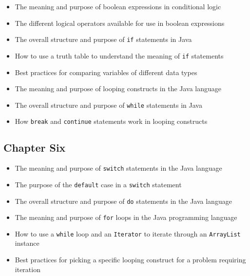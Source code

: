 \begin{itemize}

  \itemsep -.015in
  \item The meaning and purpose of boolean expressions in conditional logic
  \item The different logical operators available for use in boolean expressions
  \item The overall structure and purpose of {\tt if} statements in Java
  \item How to use a truth table to understand the meaning of {\tt if} statements
  \item Best practices for comparing variables of different data types
  \item The meaning and purpose of looping constructs in the Java language
  \item The overall structure and purpose of {\tt while} statements in Java
  \item How {\tt break} and {\tt continue} statements work in looping constructs

\end{itemize}

\vspace*{-.15in}
\subsection*{Chapter Six}
\vspace*{-.15in}

\begin{itemize}

  \itemsep -.015in
  \item The meaning and purpose of {\tt switch} statements in the Java language
  \item The purpose of the {\tt default} case in a {\tt switch} statement
  \item The overall structure and purpose of {\tt do} statements in the Java language
  \item The meaning and purpose of {\tt for} loops in the Java programming language
  \item How to use a {\tt while} loop and an {\tt Iterator} to iterate through an {\tt ArrayList} instance
  \item Best practices for picking a specific looping construct for a problem requiring iteration

\end{itemize}

